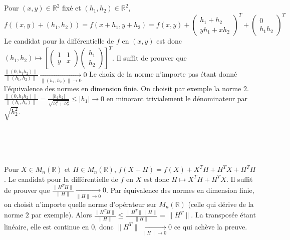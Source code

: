 \documentclass{report}
\begin{document}
\subsection{} \noindent{}\\ 
\\ 
\\
\noindent Pour $(x,y)\in \mathbb R^2$ fixé et $(h_1,h_2)\in \mathbb R^2$, \newline 
$f((x,y)+(h_1,h_2))=f(x+h_1,y+h_2)=f(x,y)+\begin{pmatrix}
h_1+h_2 \\ yh_1 + xh_2
\end{pmatrix}^T + \begin{pmatrix}
0 \\ h_1 h_2
\end{pmatrix}^T$\newline
Le candidat pour la différentielle de $f$ en $(x,y)$ est donc $(h_1,h_2)\mapsto \left[\begin{pmatrix}
1 & 1\\
y & x 
\end{pmatrix} \begin{pmatrix}
h_1 \\ h_2
\end{pmatrix}\right]^T$. \newline
Il suffit de prouver que $\displaystyle \frac{\left\|(0,h_1h_2)\right\|}{\left\| 
(h_1, h_2)\right\|}\xrightarrow[\left\| 
(h_1, h_2)\right\|\to 0]{}0$\newline 
Le choix de la norme n'importe pas étant donné l'équivalence des normes en dimension finie. On choisit par exemple la norme $2$.\newline
$\displaystyle \frac{\left\|(0,h_1h_2)\right\|}{\left\| 
(h_1, h_2)\right\|} = \frac{|h_1 h_2|}{\sqrt{h^2_1+h^2_2}}\leq |h_1|\to 0$ \newline  en minorant trivialement le dénominateur par $\sqrt {h^2_2}$.

\subsection{} \noindent{}\\ 
\\ 
\\
\noindent Pour $X\in M_n(\mathbb R)$ et $H\in M_n(\mathbb R)$, $f(X+H)=f(X)+X^TH+H^TX+H^TH$.\newline
Le candidat pour la différentielle de $f$ en $X$ est donc $H\mapsto X^TH+H^TX$.\newline
Il suffit de prouver que $\frac{\|H^TH\|}{\|H\|}\xrightarrow[\|H\|\to 0]{} 0$.\newline
Par équivalence des normes en dimension finie, on choisit n'importe quelle norme d'opérateur sur $M_n(\mathbb R)$ (celle qui dérive de la norme $2$ par exemple). Alors $\frac{\|H^TH\|}{\|H\|}\leq \frac{\|H^T\| \|H\|}{\|H\|} = \|H^T\|$. La transposée étant linéaire, elle est continue en $0$, donc $\|H^T\|\xrightarrow[\|H\|\to 0]{} 0 $ ce qui achève la preuve.
\end{document}
